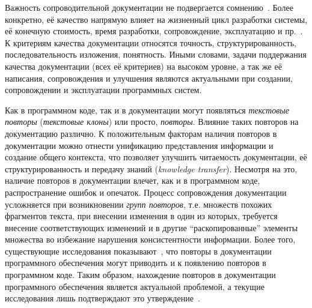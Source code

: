 Важность сопроводительной документации не подвергается сомнению~\cite{kipyegen2013importance,chomal2014significance}.
Более конкретно, её качество напрямую влияет на жизненный цикл разработки системы, её конечную стоимость, время разработки, сопровождение, эксплуатацию и пр.~\cite{plosch2014value}. 
К критериям качества документации относятся точность, структурированность, последовательность изложения, понятность.
Иными словами, задачи поддержания качества документации (всех её критериев) на высоком уровне, а так же её написания, сопровождения и улучшения являются актуальными при создании, сопровождении и эксплуатации программных систем.

Как в программном коде, так и в документации могут появляться \emph{текстовые повторы} (\emph{текстовые клоны}) или просто, \emph{повторы}.
Влияние таких повторов на документацию различно.
К положительным факторам наличия повторов в документации можно отнести унификацию представления информации и создание общего контекста, что позволяет улучшить читаемость документации, её структурированность и передачу знаний (\emph{knowledge transfer}).
Несмотря на это, наличие повторов в документации влечет, как и в программном коде,  распространение ошибок и опечаток.
Процесс сопровождения документации усложняется при возникновении \emph{групп повторов}, т.е. множеств похожих фрагментов текста, при внесении изменения в один из которых, требуется внесение соответствующих изменений и в другие ``раскопированные'' элементы множества во избежание нарушения консистентности информации.
Более того, существующие исследования показывают~\cite{juergens2010can}, что повторы в документации программного обеспечения могут приводить и к появлению повторов в программном коде.
Таким образом, нахождение повторов в документации программного обеспечения является актуальной проблемой, а текущие исследования лишь подтверждают это утверждение~\cite{horie2010tool, poruban2014reusable, poruban2016preliminary, juergens2010can, oumaziz2017documentation}.

